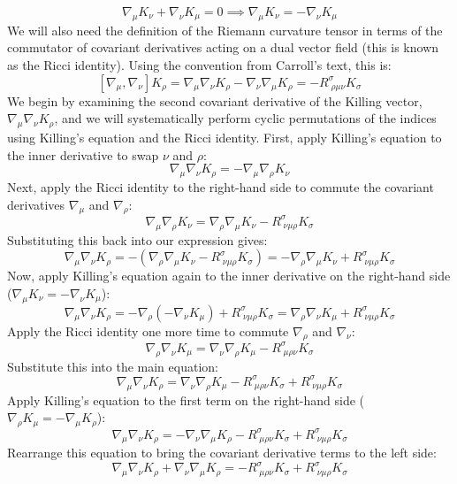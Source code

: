 \documentclass[11pt, a4paper]{report}
\begin{document}
$$\nabla_{\mu} K_{\nu} + \nabla_{\nu} K_{\mu} = 0 \implies \nabla_{\mu} K_{\nu} = -\nabla_{\nu} K_{\mu}$$
We will also need the definition of the Riemann curvature tensor in terms of the commutator of covariant derivatives acting on a dual vector field (this is known as the Ricci identity). Using the convention from Carroll's text, this is:
$$[\nabla_{\mu}, \nabla_{\nu}] K_{\rho} = \nabla_{\mu} \nabla_{\nu} K_{\rho} - \nabla_{\nu} \nabla_{\mu} K_{\rho} = -R^{\sigma}_{\; \rho\mu\nu} K_{\sigma}$$
We begin by examining the second covariant derivative of the Killing vector, $\nabla_{\mu} \nabla_{\nu} K_{\rho}$, and we will systematically perform cyclic permutations of the indices using Killing's equation and the Ricci identity.
First, apply Killing's equation to the inner derivative to swap $\nu$ and $\rho$:
$$\nabla_{\mu} \nabla_{\nu} K_{\rho} = -\nabla_{\mu} \nabla_{\rho} K_{\nu}$$
Next, apply the Ricci identity to the right-hand side to commute the covariant derivatives $\nabla_{\mu}$ and $\nabla_{\rho}$:
$$\nabla_{\mu} \nabla_{\rho} K_{\nu} = \nabla_{\rho} \nabla_{\mu} K_{\nu} - R^{\sigma}_{\; \nu\mu\rho} K_{\sigma}$$
Substituting this back into our expression gives:
$$\nabla_{\mu} \nabla_{\nu} K_{\rho} = -\left( \nabla_{\rho} \nabla_{\mu} K_{\nu} - R^{\sigma}_{\; \nu\mu\rho} K_{\sigma} \right) = -\nabla_{\rho} \nabla_{\mu} K_{\nu} + R^{\sigma}_{\; \nu\mu\rho} K_{\sigma}$$
Now, apply Killing's equation again to the inner derivative on the right-hand side ($\nabla_{\mu} K_{\nu} = -\nabla_{\nu} K_{\mu}$):
$$\nabla_{\mu} \nabla_{\nu} K_{\rho} = -\nabla_{\rho} (-\nabla_{\nu} K_{\mu}) + R^{\sigma}_{\; \nu\mu\rho} K_{\sigma} = \nabla_{\rho} \nabla_{\nu} K_{\mu} + R^{\sigma}_{\; \nu\mu\rho} K_{\sigma}$$
Apply the Ricci identity one more time to commute $\nabla_{\rho}$ and $\nabla_{\nu}$:
$$\nabla_{\rho} \nabla_{\nu} K_{\mu} = \nabla_{\nu} \nabla_{\rho} K_{\mu} - R^{\sigma}_{\; \mu\rho\nu} K_{\sigma}$$
Substitute this into the main equation:
$$\nabla_{\mu} \nabla_{\nu} K_{\rho} = \nabla_{\nu} \nabla_{\rho} K_{\mu} - R^{\sigma}_{\; \mu\rho\nu} K_{\sigma} + R^{\sigma}_{\; \nu\mu\rho} K_{\sigma}$$
Apply Killing's equation to the first term on the right-hand side ($\nabla_{\rho} K_{\mu} = -\nabla_{\mu} K_{\rho}$):
$$\nabla_{\mu} \nabla_{\nu} K_{\rho} = -\nabla_{\nu} \nabla_{\mu} K_{\rho} - R^{\sigma}_{\; \mu\rho\nu} K_{\sigma} + R^{\sigma}_{\; \nu\mu\rho} K_{\sigma}$$
Rearrange this equation to bring the covariant derivative terms to the left side:
$$\nabla_{\mu} \nabla_{\nu} K_{\rho} + \nabla_{\nu} \nabla_{\mu} K_{\rho} = - R^{\sigma}_{\; \mu\rho\nu} K_{\sigma} + R^{\sigma}_{\; \nu\mu\rho} K_{\sigma}$$
\end{document}

